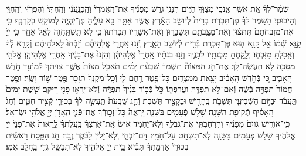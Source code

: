 \documentclass[twoside, openany, parskip=half, 11pt]{book}
\begin{document}
\begin{footnotesize}
\begin{multicols}{2}
שְֿׁמָ֨ר־לְֿךָ֔ אֵ֛ת אֲשֶׁ֥ר אָֽנֹכִ֖י מְֿצַוְּֿךָ֣ הַיּ֑וֹם הִנְנִ֧י גֹרֵ֣שׁ מִפָּנֶ֗יךָ אֶת־הָֽאֱמֹרִי֙ וְֿהַֽכְּֿנַֽעֲנִ֔י וְֿהַֽחִתִּי֙ וְֿהַפְּֿרִזִּ֔י וְֿהַֽחִוִּ֖י וְֿהַיְֿבוּסִֽי׃ הִשָּׁ֣מֶר לְֿךָ֗ פֶּן־תִּכְרֹ֤ת בְּֿרִית֙ לְֿיוֹשֵׁ֣ב הָאָ֔רֶץ אֲשֶׁ֥ר אַתָּ֖ה בָּ֣א עָלֶ֑יהָ פֶּן־יִֽהְיֶ֥ה לְֿמוֹקֵ֖שׁ בְּֿקִרְבֶּֽךָ׃ כִּ֤י אֶת־מִזְבְּֿחֹתָם֙ תִּתֹּצ֔וּן וְֿאֶת־מַצֵּֽבֹתָ֖ם תְּֿשַׁבֵּר֑וּן וְֿאֶת־אֲשֵׁרָ֖יו תִּכְרֹתֽוּן׃ כִּ֛י לֹ֥א תִֽשְׁתַּֽחֲוֶ֖ה לְֿאֵ֣ל אַחֵ֑ר כִּ֤י יְיָ֙ קַנָּ֣א שְֿׁמ֔וֹ אֵ֥ל קַנָּ֖א הֽוּא׃ פֶּן־תִּכְרֹ֥ת בְּֿרִ֖ית לְֿיוֹשֵׁ֣ב הָאָ֑רֶץ וְֿזָנ֣וּ אַֽחֲרֵ֣י אֱלֹֽהֵיהֶ֗ם וְֿזָבְֿחוּ֙ לֵאלֹ֣הֵיהֶ֔ם וְֿקָרָ֣א לְֿךָ֔ וְֿאָֽכַלְתָּ֖ מִזִּבְחֽוֹ׃ וְֿלָֽקַחְתָּ֥ מִבְּֿנֹתָ֖יו לְֿבָנֶ֑יךָ וְֿזָנ֣וּ בְֿנֹתָ֗יו אַֽחֲרֵי֙ אֱלֹ֣הֵיהֶ֔ן וְֿהִזְנוּ֙ אֶת־בָּנֶ֔יךָ אַֽחֲרֵ֖י אֱלֹֽהֵיהֶֽן׃ אֱלֹהֵ֥י מַסֵּכָ֖ה לֹ֥א תַֽעֲשֶׂה־לָּֽךְ׃  אֶת־חַ֣ג הַמַּצּוֹת֘ תִּשְׁמֹר֒ שִׁבְעַ֨ת יָמִ֜ים תֹּאכַ֤ל מַצּוֹת֙ אֲשֶׁ֣ר צִוִּיתִ֔ךָ לְֿמוֹעֵ֖ד חֹ֣דֶשׁ הָֽאָבִ֑יב כִּ֚י בְּֿחֹ֣דֶשׁ הָֽאָבִ֔יב יָצָ֖אתָ מִמִּצְרָֽיִם׃ כׇּל־פֶּ֥טֶר רֶ֖חֶם לִ֑י וְֿכָֽל־מִקְנְךָ֙ תִּזָּכָ֔ר פֶּ֖טֶר שׁ֥וֹר וָשֶֽׂה׃ וּפֶ֤טֶר חֲמוֹר֙ תִּפְדֶּ֣ה בְֿשֶׂ֔ה וְֿאִם־לֹ֥א תִפְדֶּ֖ה וַֽעֲרַפְתּ֑וֹ כֹּ֣ל בְּֿכ֤וֹר בָּנֶ֨יךָ֙ תִּפְדֶּ֔ה וְֿלֹא־יֵֽרָא֥וּ פָנַ֖י רֵיקָֽם׃ שֵׁ֤שֶׁת יָמִים֙ תַּֽעֲבֹ֔ד וּבַיּ֥וֹם הַשְּֿׁבִיעִ֖י תִּשְׁבֹּ֑ת בֶּֽחָרִ֥ישׁ וּבַקָּצִ֖יר תִּשְׁבֹּֽת׃ וְֿחַ֤ג שָֽׁבֻעֹת֙ תַּֽעֲשֶׂ֣ה לְֿךָ֔ בִּכּוּרֵ֖י קְֿצִ֣יר חִטִּ֑ים וְֿחַג֙ הָֽאָסִ֔יף תְּֿקוּפַ֖ת הַשָּׁנָֽה׃ שָׁל֥שׁ פְּֿעָמִ֖ים בַּשָּׁנָ֑ה יֵֽרָאֶה֙ כׇּל־זְכ֣וּרְֿךָ֔ אֶת־פְּֿנֵ֛י הָֽאָדֹ֥ן יְיָ֖ אֱלֹהֵ֥י יִשְׂרָאֵֽל׃ כִּֽי־אוֹרִ֤ישׁ גּוֹיִם֙ מִפָּנֶ֔יךָ וְֿהִרְחַבְתִּ֖י אֶת־גְּֿבֻלֶ֑ךָ וְֿלֹֽא־יַחְמֹ֥ד אִישׁ֙ אֶֽת־אַרְצְךָ֔ בַּֽעֲלֹֽתְֿךָ֗ לֵֽרָאוֹת֙ אֶת־פְּֿנֵי֙ יְיָ֣ אֱלֹהֶ֔יךָ שָׁל֥שׁ פְּֿעָמִ֖ים בַּשָּׁנָֽה׃ לֹֽא־תִשְׁחַ֥ט עַל־חָמֵ֖ץ דַּם־זִבְחִ֑י וְֿלֹֽא־יָלִ֣ין לַבֹּ֔קֶר זֶ֖בַח חַ֥ג הַפָּֽסַח׃ רֵאשִׁ֗ית בִּכּוּרֵי֙ אַדְמָ֣תְֿךָ֔ תָּבִ֕יא בֵּ֖ית יְיָ֣ אֱלֹהֶ֑יךָ לֹֽא־תְֿבַשֵּׁ֥ל גְּֿדִ֖י בַּֽחֲלֵ֥ב אִמּֽוֹ׃



\end{multicols}
\end{footnotesize}
\end{document}
